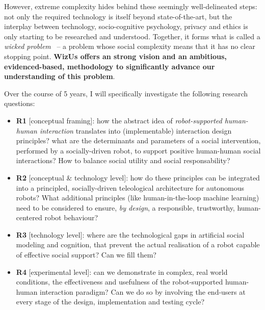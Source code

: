 \documentclass[11pt,a4paper]{report}
\newcommand{\project}{WizUs\xspace}
\begin{document}
However, extreme complexity hides behind these seemingly well-delineated steps:
not only the required technology is itself beyond state-of-the-art, but the
interplay between technology, socio-cognitive psychology, privacy and ethics is
only starting to be researched and understood. Together, it forms what is called
a \emph{wicked problem}~\cite{tonkinwise2015design} -- a problem whose social complexity
means that it has no clear stopping point. \textbf{\project offers an
strong vision and an ambitious, evidenced-based, methodology to significantly
advance our understanding of this problem}.

Over the course of 5 years, I will specifically investigate the following
research questions:

\begin{itemize}
    \item \textbf{R1} [conceptual framing]: how the abstract idea of
        \emph{robot-supported human-human interaction} translates into
        (implementable) interaction design principles? what are the determinants
        and parameters of a social intervention, performed by a socially-driven
        robot, to support positive human-human social interactions? How to
        balance social utility and social responsability?

    \item \textbf{R2} [conceptual \& technology level]: how do these principles
        can be integrated into a principled, socially-driven teleological
        architecture for autonomous robots? What additional principles (like
        human-in-the-loop machine learning) need to be considered to ensure,
        \emph{by design}, a responsible, trustworthy, human-centered robot
        behaviour?

    \item \textbf{R3} [technology level]: where are the technological gaps in
        artificial social modeling and cognition, that prevent the actual
        realisation of a robot capable of effective social support? Can we fill
        them?

    \item \textbf{R4} [experimental level]: can we demonstrate in complex, real
        world conditions, the effectiveness and usefulness of the
        robot-supported human-human interaction paradigm? Can we do so by
        involving the end-users at every stage of the design, implementation and
        testing cycle?

\end{itemize}
\end{document}
